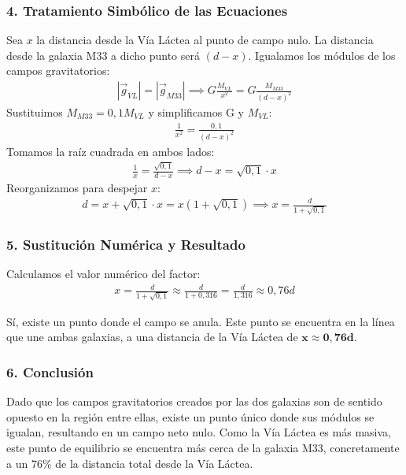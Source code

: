 \subsubsection*{4. Tratamiento Simbólico de las Ecuaciones}
Sea $x$ la distancia desde la Vía Láctea al punto de campo nulo. La distancia desde la galaxia M33 a dicho punto será $(d-x)$. Igualamos los módulos de los campos gravitatorios:
\begin{gather}
    |\vec{g}_{VL}| = |\vec{g}_{M33}| \implies G \frac{M_{VL}}{x^2} = G \frac{M_{M33}}{(d-x)^2}
\end{gather}
Sustituimos $M_{M33} = 0,1 M_{VL}$ y simplificamos G y $M_{VL}$:
\begin{gather}
    \frac{1}{x^2} = \frac{0,1}{(d-x)^2}
\end{gather}
Tomamos la raíz cuadrada en ambos lados:
\begin{gather}
    \frac{1}{x} = \frac{\sqrt{0,1}}{d-x} \implies d-x = \sqrt{0,1} \cdot x
\end{gather}
Reorganizamos para despejar $x$:
\begin{gather}
    d = x + \sqrt{0,1} \cdot x = x(1 + \sqrt{0,1}) \implies x = \frac{d}{1 + \sqrt{0,1}}
\end{gather}

\subsubsection*{5. Sustitución Numérica y Resultado}
Calculamos el valor numérico del factor:
\begin{gather}
    x = \frac{d}{1 + \sqrt{0,1}} \approx \frac{d}{1 + 0,316} = \frac{d}{1,316} \approx 0,76 d
\end{gather}
\begin{cajaresultado}
    Sí, existe un punto donde el campo se anula. Este punto se encuentra en la línea que une ambas galaxias, a una distancia de la Vía Láctea de $\boldsymbol{x \approx 0,76d}$.
\end{cajaresultado}

\subsubsection*{6. Conclusión}
\begin{cajaconclusion}
Dado que los campos gravitatorios creados por las dos galaxias son de sentido opuesto en la región entre ellas, existe un punto único donde sus módulos se igualan, resultando en un campo neto nulo. Como la Vía Láctea es más masiva, este punto de equilibrio se encuentra más cerca de la galaxia M33, concretamente a un 76\% de la distancia total desde la Vía Láctea.
\end{cajaconclusion}

